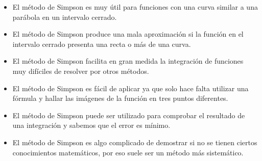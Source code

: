 
\begin{itemize}

	\item El m\'etodo de Simpson es muy \'util para funciones con una curva similar a una par\'abola en un intervalo cerrado.

	\item El m\'etodo de Simpson produce una mala aproximaci\'on si la funci\'on en el intervalo cerrado presenta una recta o m\'as de una curva.
	
	\item El m\'etodo de Simpson facilita en gran medida la integraci\'on de funciones muy dif\'iciles de resolver por otros m\'etodos.

	\item El m\'etodo de Simpson es f\'acil de aplicar ya que solo hace falta utilizar una f\'ormula y hallar las im\'agenes de la funci\'on en tres puntos diferentes.
	
	\item El m\'etodo de Simpson puede ser utilizado para comprobar el resultado de una integraci\'on y sabemos que el error es m\'inimo.
	
	\item El m\'etodo de Simpson es algo complicado de demostrar si no se tienen ciertos conocimientos matem\'aticos, por eso suele ser un m\'etodo m\'as sistem\'atico.

\end{itemize}
